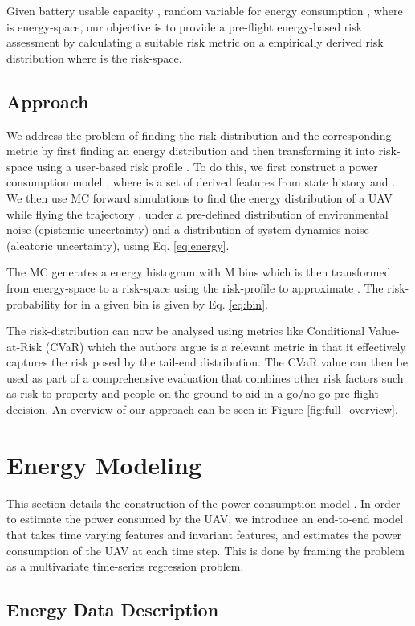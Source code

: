 \documentclass[letterpaper, 10 pt, conference]{ieeeconf}
\begin{document}
Given battery usable capacity , random variable for energy consumption , where  is energy-space, our objective is to provide a pre-flight energy-based risk assessment by calculating a suitable risk metric on a empirically derived risk distribution  where  is the risk-space.
\subsection{Approach}
We address the problem of finding the risk distribution and the corresponding metric by first finding an energy distribution  and then transforming it into risk-space using a user-based risk profile . To do this, we first construct a power consumption model , where  is a set of derived features from state history  and . We then use  MC forward simulations to find the energy distribution of a UAV while flying the trajectory , under a pre-defined distribution of environmental noise  (epistemic uncertainty) and a distribution of system dynamics noise  (aleatoric uncertainty), using Eq. \ref{eq:energy}.

The MC generates a energy histogram with M bins which is then transformed from energy-space to a risk-space using the risk-profile  to approximate . The risk-probability for  in a given bin  is given by Eq. \ref{eq:bin}.


The risk-distribution can now be analysed using metrics like Conditional Value-at-Risk (CVaR) which the authors argue is a relevant metric in that it effectively captures the risk posed by the tail-end distribution. The CVaR value can then be used as part of a comprehensive evaluation that combines other risk factors such as risk to property and people on the ground to aid in a go/no-go pre-flight decision.
An overview of our approach can be seen in Figure \ref{fig:full_overview}.

\section{Energy Modeling}
\label{sec:energy_model}
This section details the construction of the power consumption model . In order to estimate the power consumed by the UAV, we introduce an end-to-end model that takes time varying features and invariant features, and estimates the power consumption of the UAV at each time step. This is done by framing the problem as a multivariate time-series regression problem.
\subsection{Energy Data Description}
\end{document}
